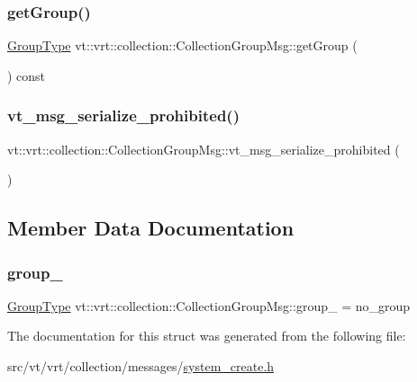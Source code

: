 \subsubsection{\texorpdfstring{get\+Group()}{getGroup()}}
{\footnotesize\ttfamily \hyperlink{namespacevt_a27b5e4411c9b6140c49100e050e2f743}{Group\+Type} vt\+::vrt\+::collection\+::\+Collection\+Group\+Msg\+::get\+Group (\begin{DoxyParamCaption}{ }\end{DoxyParamCaption}) const\hspace{0.3cm}{\ttfamily [inline]}}

\mbox{\label{structvt_1_1vrt_1_1collection_1_1_collection_group_msg_ae4d92c74c6899563aada25b9d5ffad06}} 
\subsubsection{\texorpdfstring{vt\+\_\+msg\+\_\+serialize\+\_\+prohibited()}{vt\_msg\_serialize\_prohibited()}}
{\footnotesize\ttfamily vt\+::vrt\+::collection\+::\+Collection\+Group\+Msg\+::vt\+\_\+msg\+\_\+serialize\+\_\+prohibited (\begin{DoxyParamCaption}{ }\end{DoxyParamCaption})}



\subsection{Member Data Documentation}
\mbox{\label{structvt_1_1vrt_1_1collection_1_1_collection_group_msg_a239d07dbff6442f841aafe126af98dce}} 
\subsubsection{\texorpdfstring{group\+\_\+}{group\_}}
{\footnotesize\ttfamily \hyperlink{namespacevt_a27b5e4411c9b6140c49100e050e2f743}{Group\+Type} vt\+::vrt\+::collection\+::\+Collection\+Group\+Msg\+::group\+\_\+ = no\+\_\+group\hspace{0.3cm}{\ttfamily [private]}}



The documentation for this struct was generated from the following file\+:\begin{DoxyCompactItemize}
\item 
src/vt/vrt/collection/messages/\hyperlink{system__create_8h}{system\+\_\+create.\+h}\end{DoxyCompactItemize}
